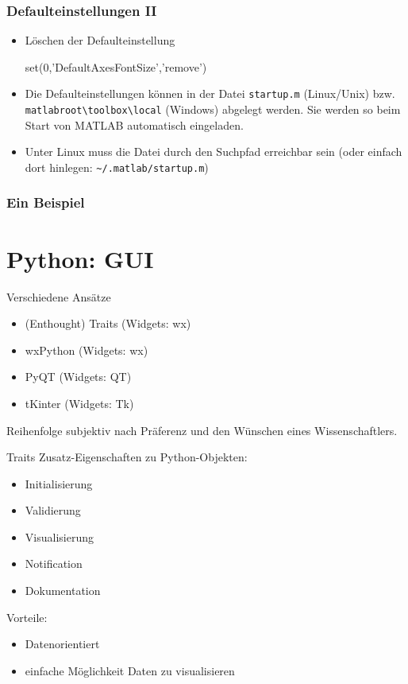 \documentclass[hyperref={xetex}]{beamer}
\begin{document}
%
%
\begin{frame}[fragile]\frametitle{Defaulteinstellungen II}
\begin{itemize}
\item L\"oschen der Defaulteinstellung
\begin{matlabin}
set(0,'DefaultAxesFontSize','remove')
\end{matlabin}
\item Die Defaulteinstellungen k\"onnen in der Datei \verb!startup.m!  (Linux/Unix)
   bzw. \verb!matlabroot\toolbox\local! (Windows) abgelegt werden. Sie werden so
  beim Start von MATLAB automatisch eingeladen. 
\item Unter Linux muss die Datei durch den Suchpfad  erreichbar
  sein (oder einfach dort hinlegen: \verb!~/.matlab/startup.m!)
\end{itemize} 
\end{frame}
\begin{frame}[fragile]\frametitle{Ein Beispiel}
\end{frame}



\section{Python: GUI}

\begin{frame}[fragile]{Verschiedene Ansätze}
\begin{itemize}
  \item \alert{(Enthought) Traits (Widgets: wx)}
  \item wxPython (Widgets: wx)
  \item PyQT (Widgets: QT)
  \item tKinter (Widgets: Tk)
\end{itemize}
Reihenfolge subjektiv nach Präferenz und den Wünschen eines Wissenschaftlers.

\end{frame}

\begin{frame}[fragile]{Traits}
Zusatz-Eigenschaften zu Python-Objekten:
\begin{itemize}
  \item Initialisierung
  \item Validierung
  \item \alert{Visualisierung}
  \item Notification
  \item Dokumentation
\end{itemize}

Vorteile:
\begin{itemize}
  \item Datenorientiert
  \item einfache Möglichkeit Daten zu visualisieren
\end{itemize}
\end{frame}
\end{document}
